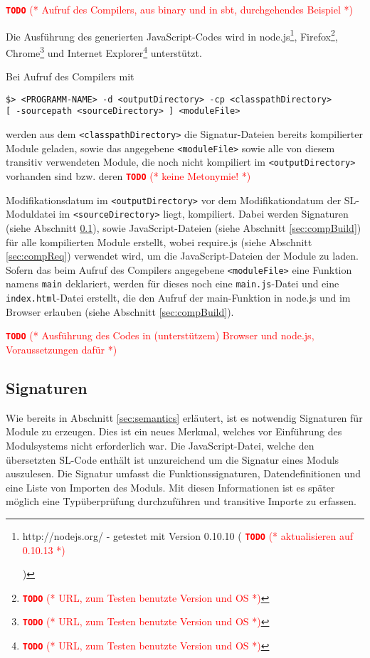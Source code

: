 \documentclass[runningheads]{llncs}
\newcommand{\TODO}[1]{ \textcolor{red}{\textbf{\texttt{\large{TODO}}} (* #1 *)}\par}
\begin{document}
\TODO{Aufruf des Compilers, aus binary und in sbt, durchgehendes Beispiel}

Die Ausführung des generierten JavaScript-Codes wird in
node.js\footnote{http://nodejs.org/ - getestet mit Version 0.10.10
(\TODO{aktualisieren auf 0.10.13})},
Firefox\footnote{\TODO{URL, zum Testen benutzte Version und OS}},
Chrome\footnote{\TODO{URL, zum Testen benutzte Version und OS}} und
Internet Explorer\footnote{\TODO{URL, zum Testen benutzte Version und OS}}
unterstützt.

Bei Aufruf des Compilers mit
\begin{lstlisting}
$> <PROGRAMM-NAME> -d <outputDirectory> -cp <classpathDirectory>
[ -sourcepath <sourceDirectory> ] <moduleFile>
\end{lstlisting}

werden aus dem \texttt{<classpathDirectory>} die Signatur-Dateien
bereits kompilierter Module geladen, sowie das angegebene
\texttt{<moduleFile>} sowie alle von diesem transitiv verwendeten Module,
die noch nicht kompiliert im \texttt{<outputDirectory>} vorhanden sind
bzw. deren \TODO{keine Metonymie!} Modifikationsdatum im
\texttt{<outputDirectory>} vor dem Modifikationdatum der
SL-Moduldatei im \texttt{<sourceDirectory>} liegt, kompiliert. Dabei
werden Signaturen (siehe Abschnitt \ref{sec:compSig}), sowie
JavaScript-Dateien (siehe Abschnitt \ref{sec:compBuild}) für alle
kompilierten Module erstellt, wobei require.js (siehe Abschnitt
\ref{sec:compReq}) verwendet wird, um die JavaScript-Dateien der
Module zu laden. Sofern das beim Aufruf des Compilers angegebene
\texttt{<moduleFile>} eine Funktion namens
\texttt{main} deklariert, werden für dieses noch eine
\texttt{main.js}-Datei und eine \texttt{index.html}-Datei erstellt,
die den Aufruf der main-Funktion in node.js und im Browser erlauben
(siehe Abschnitt \ref{sec:compBuild}).

\TODO{Ausführung des Codes in (unterstützem) Browser und node.js,
Voraussetzungen dafür}

\subsection{Signaturen}
\label{sec:compSig}

Wie bereits in Abschnitt \ref{sec:semantics} erläutert, ist es notwendig Signaturen für Module zu erzeugen. Dies ist ein neues Merkmal, welches vor Einführung des Modulsystems nicht erforderlich war. Die JavaScript-Datei, welche den übersetzten SL-Code enthält ist unzureichend um die Signatur eines Moduls auszulesen. Die Signatur umfasst die Funktionssignaturen, Datendefinitionen und eine Liste von Importen des Moduls. Mit diesen Informationen ist es später möglich eine Typüberprüfung durchzuführen und transitive Importe zu erfassen.
\end{document}
